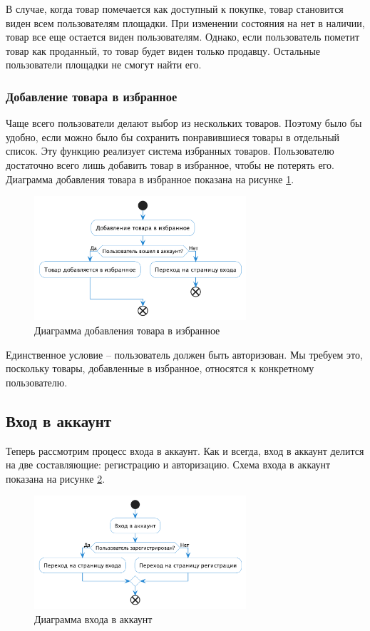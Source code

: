 \documentclass[a4paper,14pt]{extarticle}
\begin{document}
В случае, когда товар помечается как доступный к покупке, товар становится виден всем пользователям площадки. При изменении состояния на нет в наличии, товар все еще остается виден пользователям. Однако, если пользователь пометит товар как проданный, то товар будет виден только продавцу. Остальные пользователи площадки не смогут найти его.

\subsubsection*{Добавление товара в избранное}

Чаще всего пользователи делают выбор из нескольких товаров. Поэтому было бы удобно, если можно было бы сохранить понравившиеся товары в отдельный список. Эту функцию реализует система избранных товаров. Пользователю достаточно всего лишь добавить товар в избранное, чтобы не потерять его. Диаграмма добавления товара в избранное показана на рисунке \ref{fig:add_to_favourites}.

\begin{figure}[H]
    \centering
    \includegraphics[width=0.7\textwidth]{images/add_to_favourites.png}
    \caption{Диаграмма добавления товара в избранное}
    \label{fig:add_to_favourites}
\end{figure}

Единственное условие -- пользователь должен быть авторизован. Мы требуем это, поскольку товары, добавленные в избранное, относятся к конкретному пользователю.

\subsection{Вход в аккаунт}

Теперь рассмотрим процесс входа в аккаунт. Как и всегда, вход в аккаунт делится на две составляющие: регистрацию и авторизацию. Схема входа в аккаунт показана на рисунке \ref{fig:login}.

\begin{figure}[H]
    \centering
    \includegraphics[width=0.7\textwidth]{images/login.png}
    \caption{Диаграмма входа в аккаунт}
    \label{fig:login}
\end{figure}
\end{document}
